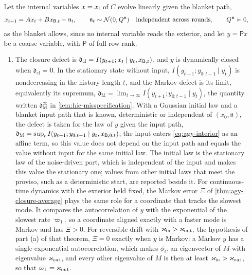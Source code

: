 \begin{definition}[Closure]\label{def:agy-closure}
Let the internal variables $x=x_{\mathsf{I}}$ of $C$ evolve linearly given the blanket path,
\begin{equation}\label{eq:agy-interior}
x_{t+1}=Ax_t+Bx_{\mathsf{B},t}+\mathfrak n_t,\qquad\mathfrak n_t\sim\mathcal{N}(0,Q^{\mathfrak n})\quad\text{independent across rounds},\qquad Q^{\mathfrak n}\succ0,
\end{equation}
as the blanket allows, since no internal variable reads the exterior, and let $y=\mathsf Px$ be a coarse variable, with $\mathsf P$ of full row rank.
\begin{enumerate}
\item[(i)] The closure defect is $\mathfrak d_{\mathrm{cl}}=I(y_{t+1};x_t\mid y_t,x_{\mathsf{B},t})$, and $y$ is dynamically closed when $\mathfrak d_{\mathrm{cl}}=0$. In the stationary state without input, $I(y_{t+1};y_{0:t-1}\mid y_t)$ is nondecreasing in the history length $t$, and the Markov defect is its limit, equivalently its supremum, $\mathfrak d_{\mathrm M}=\lim_{t\to\infty}I(y_{t+1};y_{0:t-1}\mid y_t)$, the quantity written $\mathfrak d^\infty_{\mathrm M}$ in \cref{lem:hie-misspecification}. With a Gaussian initial law and a blanket input path that is known, deterministic or independent of $(x_0,\mathfrak n)$, the defect is taken for the law of $y$ given the input path, $\mathfrak d_{\mathrm M}=\sup_tI(y_{t+1};y_{0:t-1}\mid y_t,x_{\mathsf{B},0:t})$; the input enters \eqref{eq:agy-interior} as an affine term, so this value does not depend on the input path and equals the value without input for the same initial law. The initial law is the stationary law of the noise-driven part, which is independent of the input and makes this value the stationary one; values from other initial laws that meet the proviso, such as a deterministic start, are reported beside it. For continuous-time dynamics with the exterior held fixed, the Markov error $\Xi$ of \cref{thm:agy-closure-average} plays the same role for a coordinate that tracks the slowest mode. It compares the autocorrelation of $y$ with the exponential of the slowest rate $\varpi_1$, so a coordinate aligned exactly with a faster mode is Markov and has $\Xi>0$. For reversible drift with $\varkappa_{\mathrm{in}}>\varkappa_{\mathrm{out}}$, the hypothesis of part (a) of that theorem, $\Xi=0$ exactly when $y$ is Markov: a Markov $y$ has a single-exponential autocorrelation, which makes $\phi_C$ an eigenvector of $M$ with eigenvalue $\varkappa_{\mathrm{out}}$, and every other eigenvalue of $M$ is then at least $\varkappa_{\mathrm{in}}>\varkappa_{\mathrm{out}}$, so that $\varpi_1=\varkappa_{\mathrm{out}}$.

\end{enumerate}
\end{definition}
